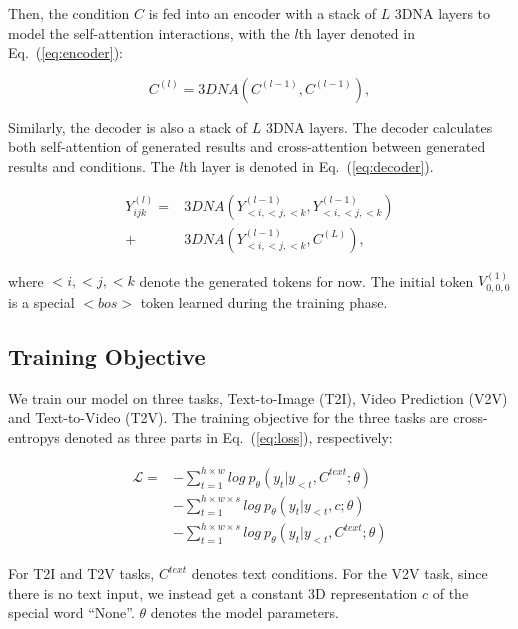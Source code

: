   
Then, the condition $C$ is fed into an encoder with a stack of $L$ 3DNA layers to model the self-attention interactions, with the $l$th layer denoted in Eq.~(\ref{eq:encoder}):

\begin{equation} \label{eq:encoder} 
C^{(l)}=3DNA(C^{(l-1)},C^{(l-1)}),
\end{equation}

Similarly, the decoder is also a stack of $L$ 3DNA layers. The decoder calculates both self-attention of generated results and cross-attention between generated results and conditions. The $l$th layer is denoted in Eq.~(\ref{eq:decoder}).

\begin{equation} \label{eq:decoder}
\begin{aligned}
Y_{ijk}^{(l)}=&3DNA(Y_{<i,<j,<k}^{(l-1)}, Y_{<i,<j,<k}^{(l-1)})\\
+&3DNA(Y_{<i,<j,<k}^{(l-1)}, C^{(L)}),
\end{aligned}
\end{equation}

where $<i,<j,<k$ denote the generated tokens for now. The initial token $V_{0,0,0}^{(1)}$ is a special $<bos>$ token learned during the training phase.
\subsection{Training Objective}\label{sec:training}
We train our model on three tasks, Text-to-Image (T2I), Video Prediction (V2V) and Text-to-Video (T2V). The training objective for the three tasks are cross-entropys denoted as three parts in Eq.~(\ref{eq:loss}), respectively:

\begin{align} \label{eq:loss} 
\begin{split}
\mathcal{L}=&-\sum\nolimits_{t=1}^{h\times w}log~p_\theta\left(y_t\big|y_{<t},C^{text};\theta\right)\\
&-\sum\nolimits_{t=1}^{h\times w\times s}log~p_\theta\left(y_t\big|y_{<t},c;\theta\right)\\
&-\sum\nolimits_{t=1}^{h\times w\times s}log~p_\theta\left(y_t\big|y_{<t},C^{text};\theta\right)
\end{split}
\end{align}

For T2I and T2V tasks, $C^{text}$ denotes text conditions. For the V2V task, since there is no text input, we instead get a constant 3D representation $c$ of the special word ``None''. $\theta$ denotes the model parameters.

